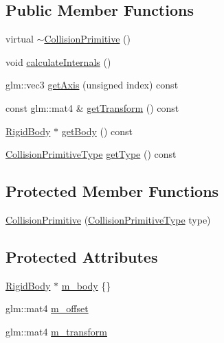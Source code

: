 \subsection*{Public Member Functions}
\begin{DoxyCompactItemize}
\item 
virtual \mbox{\hyperlink{classr3_1_1_collision_primitive_adfa75f14067cb33a3f0049895a3db880}{$\sim$\+Collision\+Primitive}} ()
\item 
void \mbox{\hyperlink{classr3_1_1_collision_primitive_ae27cb70a6812491c2d8de97f22c07ac6}{calculate\+Internals}} ()
\item 
glm\+::vec3 \mbox{\hyperlink{classr3_1_1_collision_primitive_a78c959f5ca0a09a0fc2038ac7f30e45a}{get\+Axis}} (unsigned index) const
\item 
const glm\+::mat4 \& \mbox{\hyperlink{classr3_1_1_collision_primitive_acc4e2139c698bab280338db36d7cc586}{get\+Transform}} () const
\item 
\mbox{\hyperlink{classr3_1_1_rigid_body}{Rigid\+Body}} $\ast$ \mbox{\hyperlink{classr3_1_1_collision_primitive_af8dbda90cce34a6262309cbdb75feea7}{get\+Body}} () const
\item 
\mbox{\hyperlink{namespacer3_a7079ec5e42c1a55140d3bc093d49e319}{Collision\+Primitive\+Type}} \mbox{\hyperlink{classr3_1_1_collision_primitive_ac7a318fb788d1442e7d3390c8e465e14}{get\+Type}} () const
\end{DoxyCompactItemize}
\subsection*{Protected Member Functions}
\begin{DoxyCompactItemize}
\item 
\mbox{\hyperlink{classr3_1_1_collision_primitive_a56f4cef84fcb4d92b0ced2ffcefdb22a}{Collision\+Primitive}} (\mbox{\hyperlink{namespacer3_a7079ec5e42c1a55140d3bc093d49e319}{Collision\+Primitive\+Type}} type)
\end{DoxyCompactItemize}
\subsection*{Protected Attributes}
\begin{DoxyCompactItemize}
\item 
\mbox{\hyperlink{classr3_1_1_rigid_body}{Rigid\+Body}} $\ast$ \mbox{\hyperlink{classr3_1_1_collision_primitive_a3ae500c9bd222ec42d86696702e746db}{m\+\_\+body}} \{\}
\item 
glm\+::mat4 \mbox{\hyperlink{classr3_1_1_collision_primitive_a15a51c2e72a8c5122a1031d6620a2901}{m\+\_\+offset}}
\item 
glm\+::mat4 \mbox{\hyperlink{classr3_1_1_collision_primitive_a0cb28517e7791b9836a5cac5d8550b13}{m\+\_\+transform}}
\end{DoxyCompactItemize}


